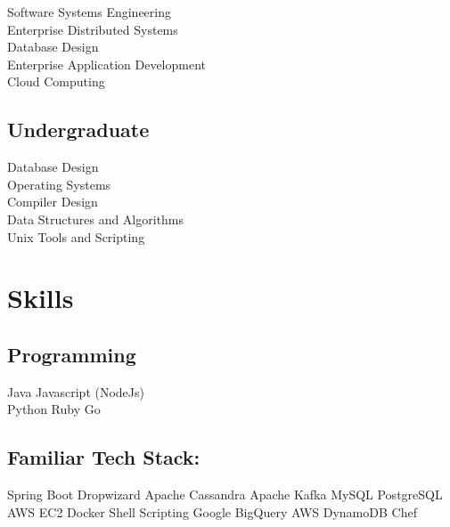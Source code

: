 \documentclass[letterpaper]{deedy-resume} %
\begin{document}
\begin{minipage}[t]{0.33\textwidth}
Software Systems Engineering \\
Enterprise Distributed Systems \\
Database Design \\
Enterprise Application Development \\
Cloud Computing

\sectionspace %


\subsection{Undergraduate}

Database Design \\
Operating Systems \\
Compiler Design \\
Data Structures and Algorithms \\
Unix Tools and Scripting

\sectionspace %


\section{Skills}

\subsection{Programming}

Java \textbullet{} Javascript (NodeJs)  \\ 
Python \textbullet{} Ruby \textbullet{} Go \\

\sectionspace

\subsection{Familiar Tech Stack:}
Spring Boot \textbullet{} Dropwizard \textbullet{} Apache Cassandra \textbullet{}  Apache Kafka \textbullet{} MySQL \textbullet{} PostgreSQL
 \textbullet{} AWS EC2  \textbullet{} Docker \textbullet{} Shell Scripting \textbullet{} Google BigQuery \textbullet{} AWS DynamoDB \textbullet{} Chef

\sectionspace

\sectionspace %


\end{minipage} %
\end{document}
